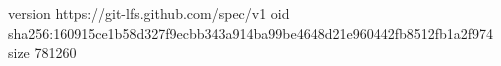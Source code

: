 version https://git-lfs.github.com/spec/v1
oid sha256:160915ce1b58d327f9ecbb343a914ba99be4648d21e960442fb8512fb1a2f974
size 781260
